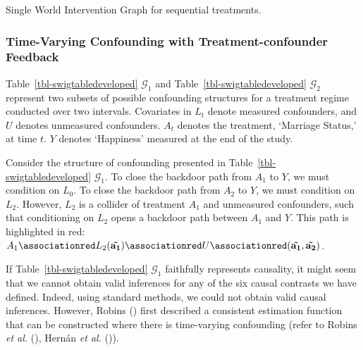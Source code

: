 \documentclass[
  single column]{article}
\begin{document}
\begin{table}

\caption{\label{tbl-swigtabledeveloped}Single World Intervention Graph
for sequential treatments.}

\centering{

\swigtabledeveloped

}

\end{table}%

\subsubsection{Time-Varying Confounding with Treatment-confounder
Feedback}\label{time-varying-confounding-with-treatment-confounder-feedback}

Table~\ref{tbl-swigtabledeveloped} \(\mathcal{G}_1\) and
Table~\ref{tbl-swigtabledeveloped} \(\mathcal{G}_2\) represent two
subsets of possible confounding structures for a treatment regime
conducted over two intervals. Covariates in \(L_t\) denote measured
confounders, and \(U\) denotes unmeasured confounders. \(A_t\) denotes
the treatment, `Marriage Status,' at time \(t\). \(Y\) denotes
`Happiness' measured at the end of the study.

Consider the structure of confounding presented in
Table~\ref{tbl-swigtabledeveloped} \(\mathcal{G}_1\). To close the
backdoor path from \(A_1\) to \(Y\), we must condition on \(L_0\). To
close the backdoor path from \(A_2\) to \(Y\), we must condition on
\(L_2\). However, \(L_2\) is a collider of treatment \(A_1\) and
unmeasured confounders, such that conditioning on \(L_2\) opens a
backdoor path between \(A_1\) and \(Y\). This path is highlighted in
red:
\(A_1 \associationred L_2({\mathbf{\tilde{a_1}}}) \associationred U \associationred ({\mathbf{\tilde{a_1}, \tilde{a_2}}})\).

If Table~\ref{tbl-swigtabledeveloped} \(\mathcal{G}_1\) faithfully
represents causality, it might seem that we cannot obtain valid
inferences for any of the six causal contrasts we have defined. Indeed,
using standard methods, we could not obtain valid causal inferences.
However, Robins () first described a
consistent estimation function that can be constructed where there is
time-varying confounding (refer to Robins \emph{et al.}
(), Hernán \emph{et al.}
()).
\end{document}
